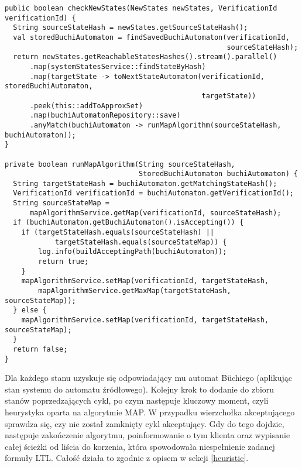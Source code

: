 \begin{minipage}{\linewidth}
\begin{lstlisting}[caption={Implementacja heurystyki pozwalającej na weryfikację modelową w locie.},captionpos=b,label={lst:checkNewStates}]
public boolean checkNewStates(NewStates newStates, VerificationId verificationId) {
  String sourceStateHash = newStates.getSourceStateHash();
  val storedBuchiAutomaton = findSavedBuchiAutomaton(verificationId,
                                                     sourceStateHash);
  return newStates.getReachableStatesHashes().stream().parallel()
      .map(systemStatesService::findStateByHash)
      .map(targetState -> toNextStateAutomaton(verificationId, storedBuchiAutomaton,
                                               targetState))
      .peek(this::addToApproxSet)
      .map(buchiAutomatonRepository::save)
      .anyMatch(buchiAutomaton -> runMapAlgorithm(sourceStateHash, buchiAutomaton));
}

private boolean runMapAlgorithm(String sourceStateHash,
                                StoredBuchiAutomaton buchiAutomaton) {
  String targetStateHash = buchiAutomaton.getMatchingStateHash();
  VerificationId verificationId = buchiAutomaton.getVerificationId();
  String sourceStateMap =
      mapAlgorithmService.getMap(verificationId, sourceStateHash);
  if (buchiAutomaton.getBuchiAutomaton().isAccepting()) {
    if (targetStateHash.equals(sourceStateHash) ||
            targetStateHash.equals(sourceStateMap)) {
        log.info(buildAcceptingPath(buchiAutomaton));
        return true;
    }
    mapAlgorithmService.setMap(verificationId, targetStateHash,
        mapAlgorithmService.getMaxMap(targetStateHash, sourceStateMap));
  } else {
    mapAlgorithmService.setMap(verificationId, targetStateHash, sourceStateMap);
  }
  return false;
}

\end{lstlisting}
\end{minipage}

Dla każdego stanu uzyskuje się odpowiadający mu automat Büchiego (aplikując stan systemu do automatu źródłowego).
Kolejny krok to dodanie do zbioru stanów poprzedzających cykl, po czym następuje kluczowy moment, czyli heurystyka oparta na algorytmie MAP.
W przypadku wierzchołka akceptującego sprawdza się, czy nie został zamknięty cykl akceptujący.
Gdy do tego dojdzie, następuje zakończenie algorytmu, poinformowanie o tym klienta oraz wypisanie całej ścieżki od liścia do korzenia, która spowodowała niespełnienie zadanej formuły LTL. Całość działa to zgodnie z opisem w sekcji \ref{heuristic}.


